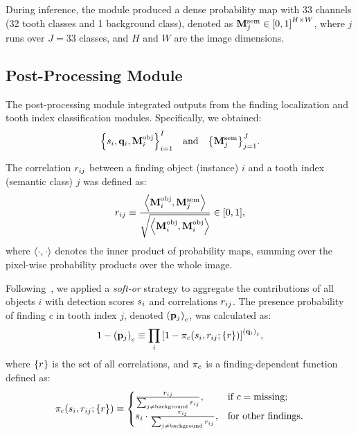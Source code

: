 During inference, the module produced a dense probability map with 33 channels (32 tooth classes and 1 background class), denoted as $\mathbf{M}^\mathrm{sem}_j\in{\left[0, 1\right]}^{H \times W}$, where $j$ runs over $J=33$ classes, and $H$ and $W$ are the image dimensions.

\subsection{Post-Processing Module}
The post-processing module integrated outputs from the finding localization and tooth index classification modules.
Specifically, we obtained:
\begin{equation}
    {\left\{s_i, \mathbf{q}_i, \mathbf{M}^\mathrm{obj}_i\right\}}_{i=1}^I \quad \text{and} \quad {\left\{\mathbf{M}^\mathrm{sem}_j\right\}}_{j=1}^J.
\end{equation}

The correlation $r_{ij}$ between a finding object (instance) $i$ and a tooth index (semantic class) $j$ was defined as:
\begin{equation}
    r_{ij} \equiv \frac{{\left\langle\mathbf{M}^\mathrm{obj}_i, \mathbf{M}^\mathrm{sem}_j\right\rangle}}{\sqrt{{\left\langle\mathbf{M}^\mathrm{obj}_i, \mathbf{M}^\mathrm{obj}_i\right\rangle}}} \in {\left[0, 1\right]},
\end{equation}
where ${\left\langle\cdot, \cdot\right\rangle}$ denotes the inner product of probability maps, summing over the pixel-wise probability products over the whole image.

Following~\citet{ardila2019end}, we applied a \emph{soft-or} strategy to aggregate the contributions of all objects $i$ with detection scores $s_i$ and correlations $r_{ij}$.
The presence probability of finding $c$ in tooth index $j$, denoted ${\left(\mathbf{p}_j\right)}_c$, was calculated as:
\begin{equation}
    1 - {\left(\mathbf{p}_j\right)}_c \equiv \prod_i {\left[ 1 - \pi_c{\left(s_i, r_{ij}; {\left\{r\right\}}\right)} \right]}^{{\left(\mathbf{q}_i\right)}_c},
\end{equation}
where ${\left\{r\right\}}$ is the set of all correlations, and $\pi_c$ is a finding-dependent function defined as:
\begin{equation}
    \pi_c{\left(s_i, r_{ij}; {\left\{r\right\}}\right)} \equiv
    \begin{cases}
        \frac{r_{ij}}{\sum_{j\neq\text{background}} r_{ij}}, & \text{if } c = \text{missing}; \\
        s_i \cdot \frac{r_{ij}}{\sum_{j\neq\text{background}} r_{ij}}, & \text{for other findings}.
    \end{cases}
\end{equation}

